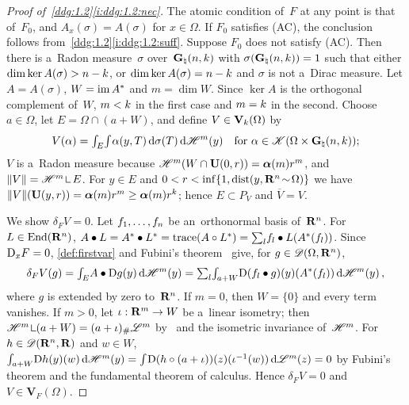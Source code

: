 \documentclass[a4paper,twoside,leqno]{article}
\newcommand{\Gk}{\pgrass{\adim}{\vdim}}        %
\begin{document}
\begin{proof}[Proof of~\ref{ddg:1.2}\ref{i:ddg:1.2:nec}]
    The atomic condition of~$F$ at any point is that of~$F_0$, and $A_x(\sigma) = A(\sigma)$ for
    $x \in \Omega$. If $F_0$ satisfies (AC), the conclusion follows
    from~\ref{ddg:1.2}\ref{i:ddg:1.2:suff}. Suppose $F_0$ does not satisfy (AC). Then there is
    a~Radon measure~$\sigma$ over~$\Gk$ with $\sigma(\Gk) = 1$ such that either $\dim \ker
    A(\sigma) > n - k$, or $\dim \ker A(\sigma) = n - k$ and $\sigma$ is not
    a~Dirac measure. Let $A = A(\sigma)$, $W = \operatorname{im} A^{*}$ and $m = \dim W$. Since $\ker A$
    is the orthogonal complement of~$W$, $m < k$ in the first case and $m = k$ in the
    second. Choose $a \in \Omega$, let $E = \Omega \cap (a + W)$, and define $V \in
    \mathbf{V}_{k}(\Omega)$ by
    \begin{displaymath}
        V(\alpha) = \textint{E}{} \textint{}{} \alpha(y,T) \ud \sigma(T) \ud \HM^m(y) \quad
        \text{for $\alpha \in \ccspace{\Omega \times \Gk}$};
    \end{displaymath}
    $V$ is a~Radon measure because $\mathscr{H}^m(W \cap \mathbf{U}(0,r)) = \boldsymbol{\alpha}(m) r^m$, and $\|V\| =
    \HM^m \restrict E$. For $y \in E$ and $0 < r < \inf \{ 1, \operatorname{dist}(y, \mathbf{R}^{n} \!\sim\! \Omega)
    \}$ we have $\|V\|(\mathbf{U}(y,r)) = \boldsymbol{\alpha}(m) r^m \ge \boldsymbol{\alpha}(m) r^{k}$; hence $E
    \subset P_V$ and $\overline V = V$.

    We show $\delta_F V = 0$. Let $f_1, \ldots, f_{n}$ be an~orthonormal basis
    of~$\mathbf{R}^{n}$. For $L \in \mathrm{End}({\mathbf{R}^{n}})$, $A \bullet L = A^{*} \bullet
    L^{*} = \operatorname{trace}(A \circ L^{*}) = {\textstyle\sum_{l}^{}} f_l \bullet L(A^{*}(f_l))$.
    Since $\mathrm{D}_x F = 0$, \ref{def:firstvar} and Fubini's theorem~\cite[2.6.2]{Federer1969} give,
    for $g \in \mathscr{D}(\Omega,\mathbf{R}^{n})$,
    \begin{displaymath}
        \delta_F V(g) = {\textstyle\int_{E}^{}} A \bullet \mathrm{D} g(y) \,\mathrm{d} \mathscr{H}^m(y) = {\textstyle\sum_{l}^{}}
        {\textstyle\int_{a + W}^{}} \mathrm{D} (f_l \bullet g)(y)(A^{*}(f_l)) \,\mathrm{d} \mathscr{H}^m(y) \,,
    \end{displaymath}
    where $g$ is extended by zero to~$\mathbf{R}^{n}$. If $m = 0$, then $W = \{0\}$ and every term
    vanishes. If $m > 0$, let $\iota : \mathbf{R}^m \to W$ be a~linear isometry; then $\HM^m \restrict (a +
    W) = (a + \iota)_\# \LM^m$ by~\cite[2.10.35]{Federer1969} and the isometric invariance
    of~$\mathscr{H}^m$. For $h \in \mathscr{D}(\mathbf{R}^{n},\mathbf{R})$ and $w \in W$, ${\textstyle\int_{a+W}^{}} \mathrm{D} h(y)(w) \,\mathrm{d}
    \mathscr{H}^m(y) = {\textstyle\int_{}^{}} \mathrm{D}(h \circ (a + \iota))(z)(\iota^{-1}(w)) \,\mathrm{d} \mathscr{L}^m(z) = 0$ by Fubini's
    theorem and the fundamental theorem of calculus. Hence $\delta_F V = 0$ and $V \in
    \mathbf{V}_F(\Omega)$.


\end{proof}
\end{document}
